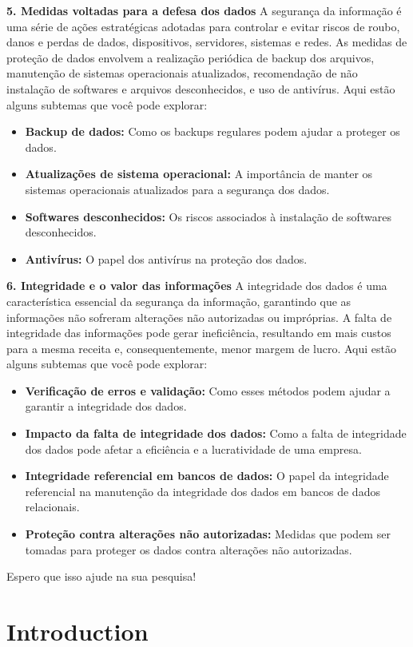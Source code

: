 \documentclass{article}
\begin{document}
\textbf{5. Medidas voltadas para a defesa dos dados} A segurança da informação é uma série de ações estratégicas adotadas para controlar e evitar riscos de roubo, danos e perdas de dados, dispositivos, servidores, sistemas e redes. As medidas de proteção de dados envolvem a realização periódica de backup dos arquivos, manutenção de sistemas operacionais atualizados, recomendação de não instalação de softwares e arquivos desconhecidos, e uso de antivírus. Aqui estão alguns subtemas que você pode explorar:
\begin{itemize}
    \item \textbf{Backup de dados:} Como os backups regulares podem ajudar a proteger os dados.

    \item \textbf{Atualizações de sistema operacional:} A importância de manter os sistemas operacionais atualizados para a segurança dos dados.

    \item \textbf{Softwares desconhecidos:} Os riscos associados à instalação de softwares desconhecidos.

    \item \textbf{Antivírus:} O papel dos antivírus na proteção dos dados.
\end{itemize}

\textbf{6. Integridade e o valor das informações} A integridade dos dados é uma característica essencial da segurança da informação, garantindo que as informações não sofreram alterações não autorizadas ou impróprias. A falta de integridade das informações pode gerar ineficiência, resultando em mais custos para a mesma receita e, consequentemente, menor margem de lucro. Aqui estão alguns subtemas que você pode explorar:
\begin{itemize}
    \item \textbf{Verificação de erros e validação:} Como esses métodos podem ajudar a garantir a integridade dos dados.

    \item \textbf{Impacto da falta de integridade dos dados:} Como a falta de integridade dos dados pode afetar a eficiência e a lucratividade de uma empresa.

    \item \textbf{Integridade referencial em bancos de dados:} O papel da integridade referencial na manutenção da integridade dos dados em bancos de dados relacionais.

    \item \textbf{Proteção contra alterações não autorizadas:} Medidas que podem ser tomadas para proteger os dados contra alterações não autorizadas.
\end{itemize}
Espero que isso ajude na sua pesquisa!

\section{Introduction}
\end{document}
